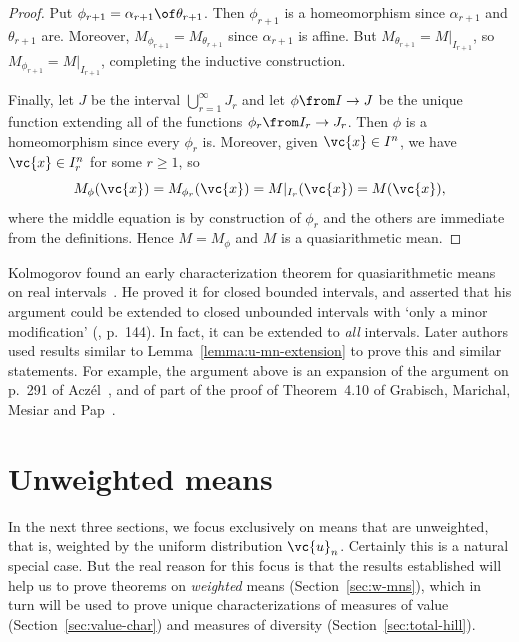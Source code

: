 \begin{proof}
Put $\phi_{r + 1} = \alpha_{r + 1} \of \theta_{r + 1}$.  Then $\phi_{r +
  1}$ is a homeomorphism since $\alpha_{r + 1}$ and $\theta_{r + 1}$ are.
Moreover, $M_{\phi_{r + 1}} = M_{\theta_{r + 1}}$ since $\alpha_{r + 1}$ is
affine.  But $M_{\theta_{r + 1}} = M|_{I_{r + 1}}$, so $M_{\phi_{r + 1}} =
M|_{I_{r + 1}}$, completing the inductive construction.

Finally, let $J$ be the interval $\bigcup_{r = 1}^\infty J_r$ 
and let $\phi \from I \to J$ be the unique function extending all of the
functions $\phi_r \from I_r \to J_r$.  Then $\phi$ is a homeomorphism
since every $\phi_r$ is.  Moreover, given $\vc{x} \in I^n$, we have
$\vc{x} \in I_r^n$ for some $r \geq 1$, so
\[
M_\phi(\vc{x})
=
M_{\phi_r}(\vc{x})
=
M|_{I_r}(\vc{x})
=
M(\vc{x}),
\]
where the middle equation is by construction of $\phi_r$ and the others are
immediate from the definitions.  Hence $M = M_\phi$ and $M$ is a
quasiarithmetic mean.
\end{proof}

\begin{remark}
Kolmogorov%
%
% 
found an early characterization theorem for quasiarithmetic means on real
intervals~\cite{KolmSNM,KolmONM}.  He proved it for closed bounded
intervals, and asserted that his argument could be extended to closed
unbounded intervals with `only a minor modification' (\cite{KolmONM},
p.~144).  In fact, it can be extended to \emph{all} intervals.  Later
authors used results similar to Lemma~\ref{lemma:u-mn-extension} to prove
this and similar statements.  For example, the argument above is an
expansion of the argument on p.~291 of Acz\'el~\cite{AczeLFE}, and of part
of the proof of Theorem~4.10 of Grabisch, Marichal, Mesiar and
Pap~\cite{GMMP}.
\end{remark}



\section{Unweighted means}


In the next three sections, we focus exclusively on means that are
unweighted, that is, weighted by the uniform distribution $\vc{u}_n$.
Certainly this is a natural special case.  But the real reason for this
focus is that the results established will help us to prove theorems on
\emph{weighted} means (Section~\ref{sec:w-mns}), which in turn will be used
to prove unique characterizations of measures of value
(Section~\ref{sec:value-char}) and measures of diversity
(Section~\ref{sec:total-hill}).

